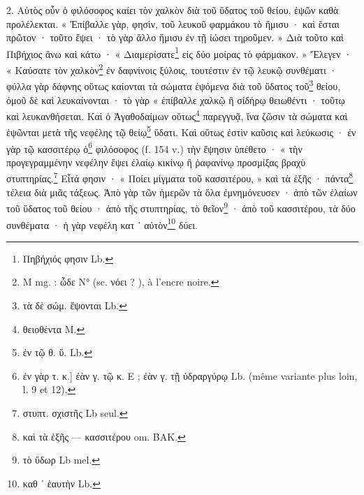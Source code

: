 \documentclass[a4paper, 11pt, oneside, polutonikogreek, french]{article}
\begin{document}
2. Αὐτὸς οὖν ὁ φιλόσοφος καίει τὸν χαλκὸν διὰ τοῦ ὕδατος τοῦ θείου, ἑψῶν καθὰ προλέλεκται. « Ἐπίβαλλε γὰρ, φησὶν, τοῦ λευκοῦ φαρμάκου τὸ ἥμισυ · καὶ ἔσται πρῶτον · τοῦτο ἕψει · τὸ γὰρ ἄλλο ἥμισυ ἐν τῇ ἰώσει τηροῦμεν. » Διὰ τοῦτο καὶ Πιβήχιος ἄνω καὶ κάτω · « Διαμερίσατε\footnote{Πηβήχιός φησιν Lb.} εἰς δύο μοίρας τὸ φάρμακον. » Ἔλεγεν · « Καύσατε τὸν χαλκὸν\footnote{M mg. : ὧδε N° (sc. νόει ? ), à l'encre noire.} ἐν δαφνίνοις ξύλοις, τουτέστιν ἐν τῷ λευκῷ συνθέματι · φύλλα γὰρ δάφνης οὕτως καίονται τὰ σώματα ἑψόμενα διὰ τοῦ ὕδατος τοῦ\footnote{τὰ δὲ σώμ. ἕψονται Lb.} θείου, ὀμοῦ δὲ καὶ λευκαίνονται · τὸ γὰρ « ἐπίβαλλε χαλκῷ ἢ σίδήρῳ θειωθέντι · τοῦτῳ καὶ λευκανθήσεται. Καὶ ὁ Ἀγαθοδαίμων οὕτως\footnote{θειοθέντα M.} παρεγγυᾷ, ἵνα ζῶσιν τὰ σώματα καὶ ἑψῶνται μετὰ τῆς νεφέλης τῷ θείῳ\footnote{ἐν τῷ θ. ὕ. Lb.} ὕδατι. Καὶ οὕτως ἐστὶν καῦσις καὶ λεύκωσις · ἐν γὰρ τῷ κασσιτέρῳ ὁ\footnote{ἐν γὰρ τ. κ.] ἐὰν γ. τῷ κ. E ; ἐὰν γ. τῇ ὑδραργύρῳ Lb. (même variante plus loin, l. 9 et 12).} φιλόσοφος (f. 154 v.) τὴν ἕψησιν ὑπέθετο · « τὴν προγεγραμμένην νεφέλην ἕψει ἐλαίῳ κικίνῳ ἢ ῥαφανίνῳ προσμίξας βραχὺ στυπτηρίας.\footnote{στυπτ. σχιστῆς Lb seul.} Εἶτά φησιν · « Ποίει μίγματα τοῦ κασσιτέρου, » καὶ τὰ ἑξῆς · πάντα\footnote{καὶ τὰ ἑξῆς --- κασσιτέρου om. BAK.} τέλεια διὰ μιᾶς τάξεως. Ἀπὸ γὰρ τῶν ἡμερῶν τὰ ὅλα ἐμνημόνευσεν · ἀπὸ τῶν ἐλαίων τοῦ ὕδατος τοῦ θείου · ἀπὸ τῆς στυπτηρίας, τὸ θεῖον\footnote{τὸ ὕδωρ Lb mel.} · ἀπὸ τοῦ κασσιτέρου, τὰ δύο συνθέματα · ἡ γὰρ νεφέλη κατ ᾽ αὐτὸν\footnote{καθ ᾽ ἑαυτὴν Lb.} δύει.
\end{document}
